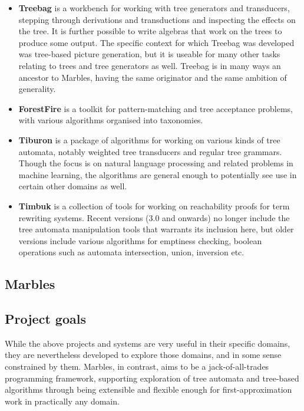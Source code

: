 \begin{itemize}
\item \textbf{Treebag} is a workbench for working with tree generators and
transducers, stepping through derivations and transductions and inspecting
the effects on the tree. It is further possible to write algebras that work
on the trees to produce some output. The specific context for which Treebag
was developed was tree-based picture generation, but it is useable for many
other tasks relating to trees and tree generators as well. Treebag is in
many ways an ancestor to Marbles, having the same originator and the same
ambition of generality.
\item \textbf{ForestFire} is a toolkit for pattern-matching and tree
acceptance problems, with various algorithms organised into taxonomies. 
\item \textbf{Tiburon} is a package of algorithms for working on various
kinds of tree automata, notably weighted tree transducers and regular tree
grammars. Though the focus is on natural language processing and related
problems in machine learning, the algorithms are general enough to
potentially see use in certain other domains as well.
\item \textbf{Timbuk} is a collection of tools for working on reachability
proofs for term rewriting systems. Recent versions (3.0 and onwards)  no
longer include the tree automata manipulation tools that warrants its
inclusion here, but older versions include various algorithms for emptiness
checking, boolean operations such as automata intersection, union,
inversion etc. 
\end{itemize}

\subsection{Marbles}



\subsection{Project goals}

While the above projects and systems are very useful in their specific
domains, they are nevertheless developed to explore those domains, and in
some sense constrained by them. Marbles, in contrast, aims to be a
jack-of-all-trades programming framework, supporting exploration of tree
automata and tree-based algorithms through being extensible and flexible
enough for first-approximation work in practically any domain.


